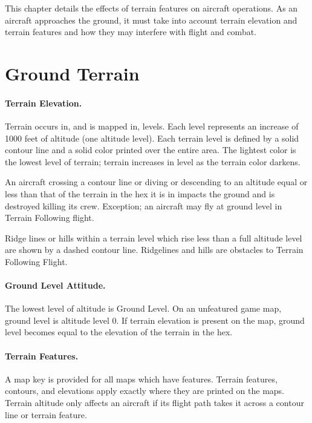

This chapter details the effects of terrain features on aircraft operations. As an aircraft approaches the ground, it must take into account terrain elevation and terrain features and how they may interfere with flight and combat.

\section{Ground Terrain}
\label{rule:ground-terrain}

\paragraph{Terrain Elevation.} Terrain occurs in, and is mapped in, levels. Each level represents an increase of 1000 feet of altitude (one altitude level). Each terrain level is defined by a solid contour line and a solid color printed over the entire area. The lightest color is the lowest level of terrain; terrain increases in level as the terrain color darkens.

An aircraft crossing a contour line or diving or descending to an altitude equal or less than that of the terrain in the hex it is in impacts the ground and is destroyed killing its crew. Exception; an aircraft may fly at ground level in Terrain Following flight.

Ridge lines or hills within a terrain level which rise less than a full altitude level are shown by a dashed contour line. Ridgelines and hills are obstacles to Terrain Following Flight.

\paragraph{Ground Level Attitude.} The lowest level of altitude is Ground Level. On an unfeatured game map, ground level is altitude level 0. If terrain elevation is present on the map, ground level becomes equal to the elevation of the terrain in the hex.

\paragraph{Terrain Features.} A map key is provided for all maps which have features. Terrain features, contours, and elevations apply exactly where they are printed on the maps. Terrain altitude only affects an aircraft if its flight path takes it across a contour line or terrain feature.

